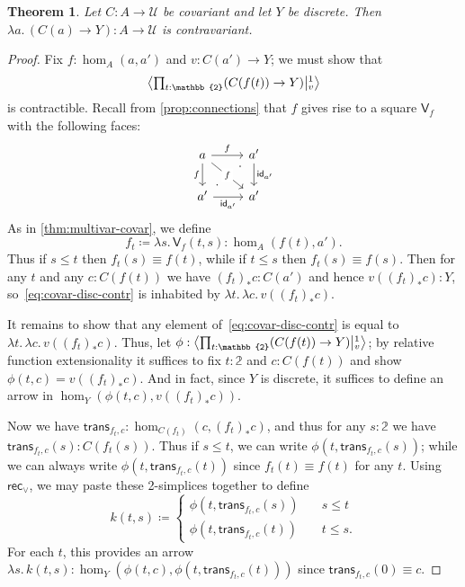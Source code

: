 \documentclass[12pt]{amsart}
\theoremstyle{plain}
\newtheorem{thm}{Theorem}[section]
\theoremstyle{definition}
\theoremstyle{remark}
\numberwithin{equation}{section}
\newcommand{\exten}[4]{\left\langle\mathchoice{\textstyle\prod_{#1}}{\textstyle\prod_{#1}}{\scriptstyle\prod_{#1}}{\scriptscriptstyle\prod_{#1}} #2 \middle|^{#3}_{#4}\right\rangle}
\newcommand{\jdeq}{\equiv}
\newcommand{\defeq}{\coloneqq}
\newcommand{\univtype}{\mathcal{U}}
\newcommand{\rec}{\mathsf{rec}}
\newcommand{\connmax}[1]{\mathsf{V}_{#1}}
\newcommand{\lam}[1]{\lambda #1.\,}
\newcommand{\two}{\mathbb{2}}
\newcommand{\idarr}[1]{\mathsf{id}_{#1}}
\newcommand{\covtr}[1]{{#1}_*}  %
\newcommand{\istrans}[2]{\mathsf{trans}_{#1,#2}}
\begin{document}
\begin{thm}\label{thm:covar-into-discrete}
  Let $C:A\to\univtype$ be covariant and let $Y$ be discrete.
  Then $\lam{a} (C(a)\to Y): A \to \univtype$ is contravariant.
\end{thm}
\begin{proof}
  Fix $f:\hom_A(a,a')$ and $v:C(a')\to Y$; we must show that
  \begin{equation}
    \exten{t:\two}{(C(f(t))\to Y)}{1}{v}\label{eq:covar-disc-contr}
  \end{equation}
  is contractible.
  Recall from \cref{prop:connections} that $f$ gives rise to a square $\connmax f$ with the following faces:
  \[
  \begin{tikzcd}
    a \arrow[r, "f"] \arrow[dr, "f" description] \arrow[d, "f"'] & a' \arrow[d, "\idarr{a'}"] \\ a' \arrow[r, "\idarr{a'}"']  \arrow[ur, phantom, "\cdot" very near start, "\cdot" very near end] & a'
  \end{tikzcd}
  \]
  As in \cref{thm:multivar-covar}, we define
  \[ f_t \defeq \lam{s} \connmax f(t,s) : \hom_A(f(t),a'). \]
  Thus if $s\le t$ then $f_t(s)\jdeq f(t)$, while if $t\le s$ then $f_t(s)\jdeq f(s)$.
  Then for any $t$ and any $c:C(f(t))$ we have $\covtr{(f_t)} c : C(a')$ and hence $v(\covtr{(f_t)} c) : Y$, so~\eqref{eq:covar-disc-contr} is inhabited by $\lam{t} \lam{c} v(\covtr{(f_t)} c)$.

  It remains to show that any element of~\eqref{eq:covar-disc-contr} is equal to $\lam{t} \lam{c} v(\covtr{(f_t)} c)$.
  Thus, let $\phi:\exten{t:\two}{(C(f(t))\to Y)}{1}{v}$; by relative function extensionality it suffices to fix $t:\two$ and $c:C(f(t))$ and show $\phi(t,c) = v(\covtr{(f_t)} c)$. And in fact, since $Y$ is discrete, it suffices to define an arrow in $\hom_Y(\phi(t,c), v((f_t)_*c))$.

  Now we have $\istrans{f_t}{c} : \hom_{C(f_t)}(c,\covtr{(f_t)} c)$, and thus for any $s:\two$ we have $\istrans{f_t}{c}(s) : C(f_t(s))$.
  Thus if $s\le t$, we can write $\phi(t,\istrans{f_t}{c}(s))$; while we can always write $\phi(t,\istrans{f_t}{c}(t))$ since $f_t(t)\jdeq f(t)$ for any $t$.
    Using $\rec_\lor$, we may paste these 2-simplices together to define
  \[
  k(t,s) \defeq
  \begin{cases}
    \phi(t,\istrans{f_t}{c}(s)) &\quad s \le t \\
    \phi(t,\istrans{f_t}{c}(t)) &\quad t \le s.
  \end{cases}
  \]
   For each $t$, this provides an arrow $\lam{s} k(t,s): \hom_Y(\phi(t,c),    \phi(t,\istrans{f_t}{c}(t)))$ 
     since $\istrans{f_t}{c}(0)\jdeq c$.


\end{proof}
\end{document}
